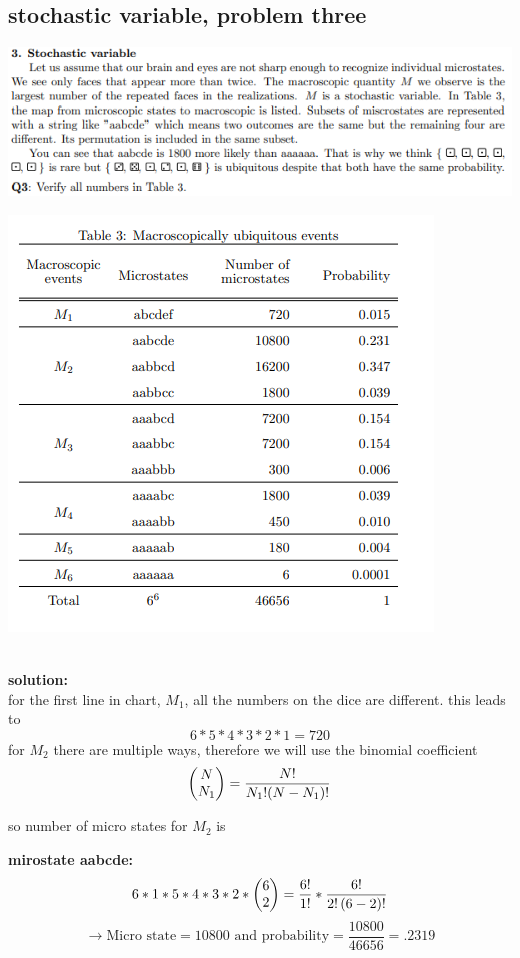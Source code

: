 \documentclass{article}
\begin{document}
\begin{flushleft}
\section{stochastic variable, problem three}
\includegraphics[scale=.7]{question3.png}
\centerline{ \includegraphics[scale=.8]{table3.png}}\\
\textbf{solution:}\\
for the first line in chart, $M_1$, all the numbers on the dice are different. this leads to \\
\[ 6*5*4*3*2*1=720\]
for $M_2$ there are multiple ways, therefore we will use the binomial coefficient \[ \mqty(N\\N_1)= \frac{N!}{N_1!(N-N_1)!} \]



so number of micro states for $M_2$ is

\textbf{mirostate aabcde:}
\[ 6*1*5*4*3*2*\mqty(6\\2)=\frac{6!}{1!}*\frac{6!}{2!\left(6-2\right)!}\]
\[ \rightarrow \text{Micro state} = 10800 \text{ and probability} = \frac{10800}{46656}=.2319\]


\end{flushleft}
\end{document}
